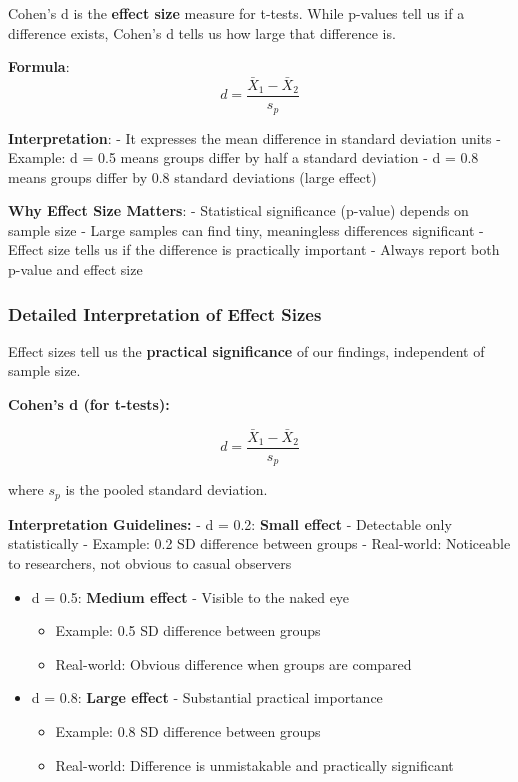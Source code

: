 \documentclass[11pt]{article}
\providecommand{\tightlist}{%
      \setlength{\itemsep}{0pt}\setlength{\parskip}{0pt}}
\begin{document}
Cohen's d is the \textbf{effect size} measure for t-tests. While
p-values tell us if a difference exists, Cohen's d tells us how large
that difference is.

\textbf{Formula}: \[d = \frac{\bar{X}_1 - \bar{X}_2}{s_p}\]

\textbf{Interpretation}: - It expresses the mean difference in standard
deviation units - Example: d = 0.5 means groups differ by half a
standard deviation - d = 0.8 means groups differ by 0.8 standard
deviations (large effect)

\textbf{Why Effect Size Matters}: - Statistical significance (p-value)
depends on sample size - Large samples can find tiny, meaningless
differences significant - Effect size tells us if the difference is
practically important - Always report both p-value and effect size

    \subsubsection{\texorpdfstring{\textbf{Detailed Interpretation of Effect
Sizes}}{Detailed Interpretation of Effect Sizes}}\label{detailed-interpretation-of-effect-sizes}

Effect sizes tell us the \textbf{practical significance} of our
findings, independent of sample size.

\textbf{Cohen's d (for t-tests):}

\[d = \frac{\bar{X}_1 - \bar{X}_2}{s_p}\]

where \(s_p\) is the pooled standard deviation.

\textbf{Interpretation Guidelines:} - \textbar d\textbar{} = 0.2:
\textbf{Small effect} - Detectable only statistically - Example: 0.2 SD
difference between groups - Real-world: Noticeable to researchers, not
obvious to casual observers

\begin{itemize}
\tightlist
\item
  \textbar d\textbar{} = 0.5: \textbf{Medium effect} - Visible to the
  naked eye

  \begin{itemize}
  \tightlist
  \item
    Example: 0.5 SD difference between groups
  \item
    Real-world: Obvious difference when groups are compared
  \end{itemize}
\item
  \textbar d\textbar{} = 0.8: \textbf{Large effect} - Substantial
  practical importance

  \begin{itemize}
  \tightlist
  \item
    Example: 0.8 SD difference between groups
  \item
    Real-world: Difference is unmistakable and practically significant
  \end{itemize}
\end{itemize}
\end{document}
